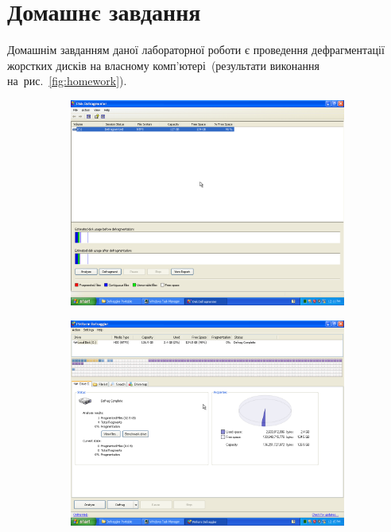 \documentclass[
	a4paper,
	oneside,
	DIV = 12,
	fontsize = 13pt,
	headings = normal,
]{scrartcl}
\begin{document}
	\section{Домашнє завдання}
		Домашнім завданням даної лабораторної роботи є проведення дефрагментації жорстких дисків на власному комп'ютері~(результати виконання на~рис.~\ref{fig:homework}).
		\begin{figure}[!htbp]
			\begin{subfigure}{0.5\textwidth}
				\centering
				\includegraphics[height = 8\baselineskip]{./assets/lab-02-hw-01.png}
				\caption{}
				\label{subfig:homework-01}
			\end{subfigure}%
			\begin{subfigure}{0.5\textwidth}
				\centering
				\includegraphics[height = 8\baselineskip]{./assets/lab-02-hw-02.png}

\end{subfigure}
\end{figure}
\end{document}

